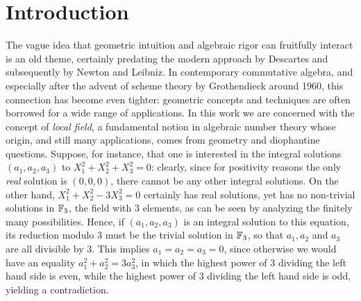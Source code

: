 \documentclass[sigplan,10pt, nonacm, review]{acmart}
\begin{document}
\section{Introduction}\label{sec:intro}
The vague idea that geometric intuition and algebraic rigor can fruitfully interact is an old theme, certainly predating the modern approach by Descartes and subsequently by Newton and Leibniz. 
In contemporary commutative algebra, and especially
after the advent of scheme theory by Grothendieck around 1960, this connection has become even tighter: geometric concepts and techniques are often borrowed for a wide range of applications. In this work we are concerned with the concept of \emph{local field}, a fundamental notion in algebraic number theory whose origin, and still many applications, comes from geometry and diophantine questions. Suppose, for instance, that one is interested in the integral solutions $(a_1,a_2,a_3)$ to $X_1^2+X_2^2+X_3^2=0$: clearly, since for positivity reasons the only \emph{real} solution is $(0,0,0)$, there cannot be any other integral solutions. On the other hand, $X_1^2+ X_2^2-3X_3^2=0$ certainly has real solutions, yet has no non-trivial solutions in $\FF[3]$, the field with $3$ elements, as can be seen by analyzing the finitely many possibilities. Hence, if $(a_1,a_2,a_3)$ is an integral solution to this equation, its reduction modulo 3 must be the trivial solution in $\FF[3]$, so that $a_1, a_2$ and $a_3$ are all divisible by $3$. This implies $a_1 = a_2 = a_3 = 0$, since otherwise we would have an equality $a_1^2 + a_2^2 = 3a_3^2$, in which the highest power of $3$ dividing the left hand side is even, while the highest power of $3$ dividing the left hand side is odd, yielding a contradiction.
\end{document}
